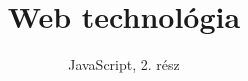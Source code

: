 \documentclass[usenames,dvipsnames,aspectratio=169]{beamer}
\title[Web technológiák - JavaScript]{Web technológia}
\subtitle{JavaScript, 2. rész}
\begin{document}
\begin{frame}[plain]
  \titlepage
  \logoalul
\end{frame}


\end{document}
